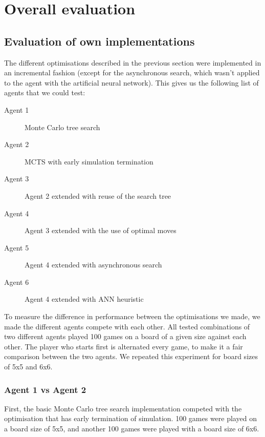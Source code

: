\section{Overall evaluation}

\subsection{Evaluation of own implementations}
The different optimisations described in the previous section were implemented in an incremental fashion (except for the asynchronous search, which wasn't applied to the agent with the artificial neural network). This gives us the following list of agents that we could test:
\begin{description}
	\item[Agent 1] Monte Carlo tree search
	\item[Agent 2] MCTS with early simulation termination
	\item[Agent 3] Agent 2 extended with reuse of the search tree
	\item[Agent 4] Agent 3 extended with the use of optimal moves
	\item[Agent 5] Agent 4 extended with asynchronous search
	\item[Agent 6] Agent 4 extended with ANN heuristic
\end{description}

To measure the difference in performance between the optimisations we made, we made the different agents compete with each other. All tested combinations of two different agents played 100 games on a board of a given size against each other. The player who starts first is alternated every game, to make it a fair comparison between the two agents.
We repeated this experiment for board sizes of 5x5 and 6x6.

\subsubsection{Agent 1 vs Agent 2}
First, the basic Monte Carlo tree search implementation competed with the optimisation that has early termination of simulation. 100 games were played on a board size of 5x5, and another 100 games were played with a board size of 6x6.

